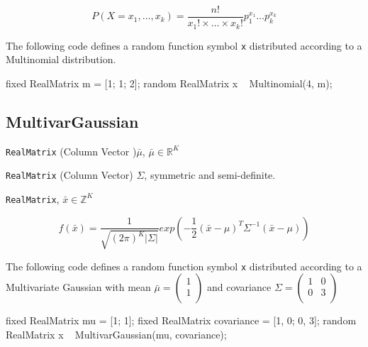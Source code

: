 \[
	P(X = x_{1},\ldots,x_{k}) = \frac{n!}{x_{1}! \times \ldots \times x_{k}!} p_{1}^{x_{1}} \ldots p_{k}^{x_{k}}
\]

The following code defines a random function symbol \verb|x| distributed according to a Multinomial distribution.
\begin{blogcode}
fixed RealMatrix m = [1; 1; 2];
random RealMatrix x ~ Multinomial(4, m);
\end{blogcode}

\subsection{MultivarGaussian}

\begin{itemize*}
\item[] \verb|RealMatrix| (Column Vector )$\bar{\mu}$, $\bar{\mu} \in \mathbb{R}^{K}$

\item[] \verb|RealMatrix| (Column Vector) $\Sigma$, symmetric and semi-definite.

\end{itemize*}

\begin{itemize*}
\item[] \verb|RealMatrix|, $\bar{x} \in \mathbb{Z}^{K} $
\end{itemize*}

\[
f(\bar{x}) = \frac{1}{\sqrt{(2\pi)^{K}|\Sigma|}}exp(-\frac{1}{2} (\bar{x} - \mu)^{T}\Sigma^{-1}(\bar{x} - \mu))
\]

The following code defines a random function symbol \verb|x| distributed according to a Multivariate Gaussian with mean $\bar{\mu} =
\begin{pmatrix}
  1  \\
  1  \\
 \end{pmatrix}$ and covariance $\Sigma =
 \begin{pmatrix}
   1 & 0 \\
   0 & 3 \\
  \end{pmatrix}
 $
\begin{blogcode}
fixed RealMatrix mu = [1; 1];
fixed RealMatrix covariance = [1, 0; 0, 3];
random RealMatrix x ~ MultivarGaussian(mu, covariance);
\end{blogcode}

